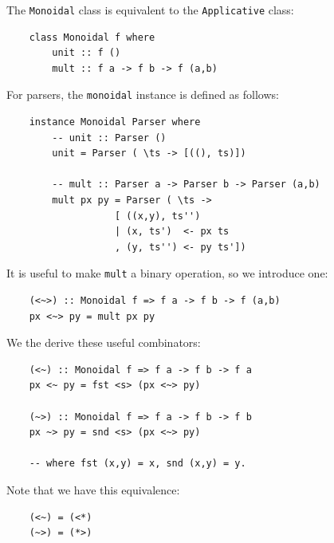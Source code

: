 \documentclass[a4paper,12pt]{article}
\theoremstyle{remark}
\begin{document}
The \lstinline{Monoidal} class is equivalent to the \lstinline{Applicative} class:

\begin{lstlisting}
    class Monoidal f where
        unit :: f ()
        mult :: f a -> f b -> f (a,b)  \end{lstlisting}

For parsers, the \lstinline{monoidal} instance is defined as follows:

\begin{lstlisting}
    instance Monoidal Parser where
        -- unit :: Parser ()
        unit = Parser ( \ts -> [((), ts)])

        -- mult :: Parser a -> Parser b -> Parser (a,b)
        mult px py = Parser ( \ts ->
                   [ ((x,y), ts'')
                   | (x, ts')  <- px ts
                   , (y, ts'') <- py ts'])  \end{lstlisting}

\begin{figure}[H]
  \centering
\end{figure}

It is useful to make \lstinline{mult} a binary operation, so we introduce one:

\begin{lstlisting}
    (<~>) :: Monoidal f => f a -> f b -> f (a,b)
    px <~> py = mult px py  \end{lstlisting}

We the derive these useful combinators:

\begin{lstlisting}
    (<~) :: Monoidal f => f a -> f b -> f a
    px <~ py = fst <s> (px <~> py)

    (~>) :: Monoidal f => f a -> f b -> f b
    px ~> py = snd <s> (px <~> py)

    -- where fst (x,y) = x, snd (x,y) = y.  \end{lstlisting}

Note that we have this equivalence:

\begin{lstlisting}
    (<~) = (<*)
    (~>) = (*>)  \end{lstlisting}
\end{document}
